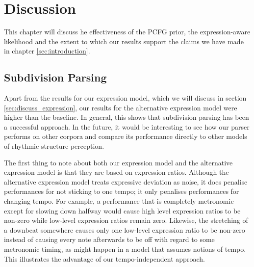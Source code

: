 \chapter{Discussion}
\label{sec:discussion}



This chapter will discuss he effectiveness of the PCFG prior, the expression-aware likelihood and the extent to which our results support the claims we have made in chapter \ref{sec:introduction}.

\section{Subdivision Parsing}

Apart from the results for our expression model, which we will discuss in section \ref{sec:discuss_expression}, our results for the alternative expression model were higher than the baseline. In general, this shows that subdivision parsing has been a successful approach. In the future, it would be interesting to see how our parser performs on other corpora and compare its performance directly to other models of rhythmic structure perception.

The first thing to note about both our expression model and the alternative expression model is that they are based on expression ratios. Although the alternative expression model treats expressive deviation as noise, it does penalise performances for not sticking to one tempo; it only penalises performances for changing tempo. For example, a performance that is completely metronomic except for slowing down halfway would cause high level expression ratios to be non-zero while low-level expression ratios remain zero. Likewise, the stretching of a downbeat somewhere causes only one low-level expression ratio to be non-zero instead of causing every note afterwards to be off with regard to some metronomic timing, as might happen in a model that assumes notions of tempo. This illustrates the advantage of our tempo-independent approach.

